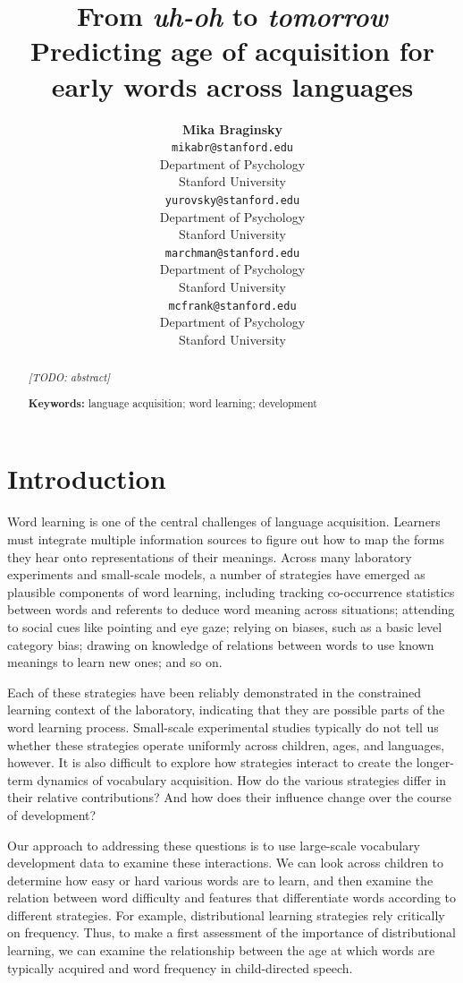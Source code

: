 \documentclass[10pt, letterpaper]{article}
\title{From \emph{uh-oh} to \emph{tomorrow}\\Predicting age of acquisition for
early words across languages}
\author{{\large \bf Mika Braginsky} \\ \texttt{mikabr@stanford.edu} \\ Department of Psychology \\ Stanford University \And {\large \bf Daniel Yurovsky} \\ \texttt{yurovsky@stanford.edu} \\ Department of Psychology \\ Stanford University \And {\large \bf Virginia A. Marchman} \\ \texttt{marchman@stanford.edu} \\ Department of Psychology \\ Stanford University \And {\large \bf Michael C. Frank} \\ \texttt{mcfrank@stanford.edu} \\ Department of Psychology \\ Stanford University}
\begin{document}
\maketitle

\begin{abstract}
\emph{{[}TODO: abstract{]}}

\textbf{Keywords:}
language acquisition; word learning; development
\end{abstract}

\section{Introduction}\label{introduction}

Word learning is one of the central challenges of language acquisition.
Learners must integrate multiple information sources to figure out how
to map the forms they hear onto representations of their meanings.
Across many laboratory experiments and small-scale models, a number of
strategies have emerged as plausible components of word learning,
including tracking co-occurrence statistics between words and referents
to deduce word meaning across situations; attending to social cues like
pointing and eye gaze; relying on biases, such as a basic level category
bias; drawing on knowledge of relations between words to use known
meanings to learn new ones; and so on.

Each of these strategies have been reliably demonstrated in the
constrained learning context of the laboratory, indicating that they are
possible parts of the word learning process. Small-scale experimental
studies typically do not tell us whether these strategies operate
uniformly across children, ages, and languages, however. It is also
difficult to explore how strategies interact to create the longer-term
dynamics of vocabulary acquisition. How do the various strategies differ
in their relative contributions? And how does their influence change
over the course of development?

Our approach to addressing these questions is to use large-scale
vocabulary development data to examine these interactions. We can look
across children to determine how easy or hard various words are to
learn, and then examine the relation between word difficulty and
features that differentiate words according to different strategies. For
example, distributional learning strategies rely critically on
frequency. Thus, to make a first assessment of the importance of
distributional learning, we can examine the relationship between the age
at which words are typically acquired and word frequency in
child-directed speech.
\end{document}
